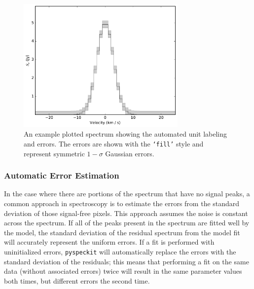 \documentclass[twocolumn]{aastex63}
\newcommand{\pyspeckit}{\texttt{pyspeckit}\xspace}
\begin{document}
\begin{figure}[!htp]
\includegraphics[scale=1,width=3.25in]{example_fig_1.pdf}
\caption{An example plotted spectrum showing the automated unit labeling
and errors.  The errors are shown with the \texttt{`fill'} style
and represent symmetric $1-\sigma$ Gaussian errors.  }
\label{fig:example1}
\end{figure}




\subsubsection{Automatic Error Estimation}
In the case where there are portions of the spectrum that have no
signal peaks, a common approach in spectroscopy is to estimate the
errors from the standard deviation of those signal-free pixels.  This approach
assumes the noise is constant across the spectrum.  If all of the peaks present
in the spectrum are fitted well by the model,
the standard deviation of the residual spectrum from the model fit will
accurately represent the uniform errors.     If a fit is performed with
uninitialized errors, \pyspeckit will automatically replace the errors with the
standard deviation of the residuals; this means that performing a fit on the
same data (without associated errors) twice will result in the same parameter
values both times, but different errors the second time.
\end{document}
